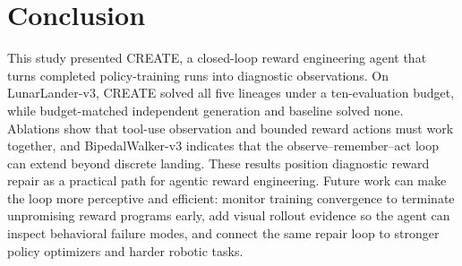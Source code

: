 \section{Conclusion}
This study presented CREATE, a closed-loop reward engineering agent that turns completed policy-training runs into diagnostic observations. On LunarLander-v3, CREATE solved all five lineages under a ten-evaluation budget, while budget-matched independent generation and baseline solved none. Ablations show that tool-use observation and bounded reward actions must work together, and BipedalWalker-v3 indicates that the observe--remember--act loop can extend beyond discrete landing. These results position diagnostic reward repair as a practical path for agentic reward engineering. Future work can make the loop more perceptive and efficient: monitor training convergence to terminate unpromising reward programs early, add visual rollout evidence so the agent can inspect behavioral failure modes, and connect the same repair loop to stronger policy optimizers and harder robotic tasks.
